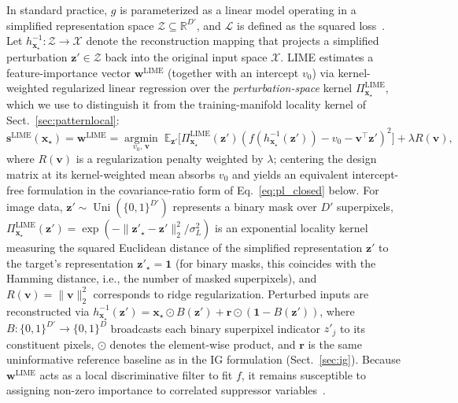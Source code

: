\documentclass[pdflatex,sn-mathphys-num]{sn-jnl}
\theoremstyle{thmstyleone}
\theoremstyle{thmstyletwo}%
\theoremstyle{thmstylethree}%
\begin{document}
In standard practice, $g$ is parameterized as a linear model operating in a simplified representation space $\mathcal{Z} \subseteq \mathbb{R}^{D'}$, and $\mathcal{L}$ is defined as the squared loss~\cite{tan2023}. Let $h_{\mathbf{x}_\star}^{-1}: \mathcal{Z} \to \mathcal{X}$ denote the reconstruction mapping that projects a simplified perturbation $\mathbf{z}' \in \mathcal{Z}$ back into the original input space $\mathcal{X}$. LIME estimates a feature-importance vector $\mathbf{w}^{\text{LIME}}$ (together with an intercept $v_0$) via kernel-weighted regularized linear regression over the \emph{perturbation-space} kernel $\Pi^{\text{LIME}}_{\mathbf{x}_\star}$, which we use to distinguish it from the training-manifold locality kernel of Sect.~\ref{sec:patternlocal}:
\begin{equation}
    \mathbf{s}^{\text{LIME}}(\mathbf{x}_\star) = \mathbf{w}^{\text{LIME}} = \operatorname*{argmin}_{v_0,\, \mathbf{v}} \; \mathbb{E}_{\mathbf{z}'} \big[ \Pi^{\text{LIME}}_{\mathbf{x}_\star}(\mathbf{z}') \left( f(h_{\mathbf{x}_\star}^{-1}(\mathbf{z}')) - v_0 - \mathbf{v}^\top \mathbf{z}' \right)^2 \big] + \lambda R(\mathbf{v}),
    \label{eq:lime}
\end{equation}
where $R(\mathbf{v})$ is a regularization penalty weighted by $\lambda$; centering the design matrix at its kernel-weighted mean absorbs $v_0$ and yields an equivalent intercept-free formulation in the covariance-ratio form of Eq.~\eqref{eq:pl_closed} below. For image data, $\mathbf{z}' \sim \operatorname{Uni}(\{0, 1\}^{D'})$ represents a binary mask over $D'$ superpixels, $\Pi^{\text{LIME}}_{\mathbf{x}_\star}(\mathbf{z}') = \exp(-\|\mathbf{z}'_\star - \mathbf{z}'\|_2^2 / \sigma_L^2)$ is an exponential locality kernel measuring the squared Euclidean distance of the simplified representation $\mathbf{z}'$ to the target's representation $\mathbf{z}'_\star = \mathbf{1}$ (for binary masks, this coincides with the Hamming distance, i.e., the number of masked superpixels), and $R(\mathbf{v}) = \|\mathbf{v}\|_2^2$ corresponds to ridge regularization. Perturbed inputs are reconstructed via $h_{\mathbf{x}_\star}^{-1}(\mathbf{z}') = \mathbf{x}_\star \odot B(\mathbf{z}') + \mathbf{r} \odot (\mathbf{1} - B(\mathbf{z}'))$, where $B: \{0, 1\}^{D'} \to \{0, 1\}^D$ broadcasts each binary superpixel indicator $z'_j$ to its constituent pixels, $\odot$ denotes the element-wise product, and $\mathbf{r}$ is the same uninformative reference baseline as in the IG formulation (Sect.~\ref{sec:ig}). Because $\mathbf{w}^{\text{LIME}}$ acts as a local discriminative filter to fit $f$, it remains susceptible to assigning non-zero importance to correlated suppressor variables~\cite{wilming2022}.
\end{document}
